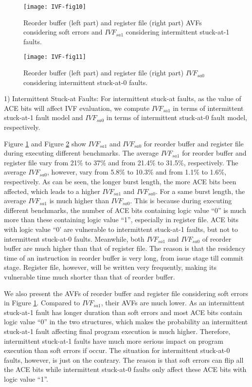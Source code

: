 \begin{figure}[t]
    \centering
    \texttt{[image: IVF-fig10]}\\
    \caption{Reorder buffer (left part) and register file (right part) AVFs considering soft errors and $IVF_{sa1}$ considering intermittent stuck-at-1 faults.}
    \label{fig:AVF-sa1}
\end{figure}

\begin{figure}[t]
    \centering
    \texttt{[image: IVF-fig11]}\\
    \caption{Reorder buffer (left part) and register file (right part) $IVF_{sa0}$ considering intermittent stuck-at-0 faults.}
    \label{fig:AVF-sa0}
\end{figure}


1) Intermittent Stuck-at Faults: For intermittent stuck-at faults, as the value of ACE bits will affect IVF evaluation, we compute $IVF_{sa1}$ in terms of intermittent stuck-at-1 fault model and $IVF_{sa0}$ in terms of intermittent stuck-at-0 fault model, respectively.

Figure \ref{fig:AVF-sa1} and Figure \ref{fig:AVF-sa0} show $IVF_{sa1}$ and $IVF_{sa0}$ for reorder buffer and register file during executing different benchmarks. The average $IVF_{sa1}$ for reorder buffer and register file vary from 21\%  to 37\% and from 21.4\% to 31.5\%, respectively. The average $IVF_{sa0}$, however, vary from 5.8\% to 10.3\% and from 1.1\% to 1.6\%, respectively. As can be seen, the longer burst length, the more ACE bits been affected, which leads to a higher $IVF_{sa1}$ and $IVF_{sa0}$. For a same burst length, the average $IVF_{sa1}$ is much higher than $IVF_{sa0}$. This is because during executing different benchmarks, the number of ACE bits containing logic value “0” is much more than these containing logic value “1”, especially in register file. ACE bits with logic value “0’ are vulnerable to intermittent stuck-at-1 faults, but not to intermittent stuck-at-0 faults. Meanwhile, both $IVF_{sa1}$ and $IVF_{sa0}$ of reorder buffer are much higher than that of register file. The reason is that the residency time of an instruction in reorder buffer is very long, from issue stage till commit stage. Register file, however, will be written very frequently, making its vulnerable time much shorter than that of reorder buffer.

We also present the AVFs of reorder buffer and register file considering soft errors in Figure \ref{fig:AVF-sa1}. Compared to $IVF_{sa1}$, their AVFs are much lower. As an intermittent stuck-at-1 fault has longer duration than soft errors and most ACE bits contain logic value “0” in the two structures, which makes the probability an intermittent stuck-at-1 fault affecting final program execution is much higher. Therefore, intermittent stuck-at-1 faults have much more serious impact on program execution than soft errors if occur. The situation for intermittent stuck-at-0 faults, however, is just on the contrary. The reason is that soft errors can flip all the ACE bits while intermittent stuck-at-0 faults only affect these ACE bits with logic value “1”. 

